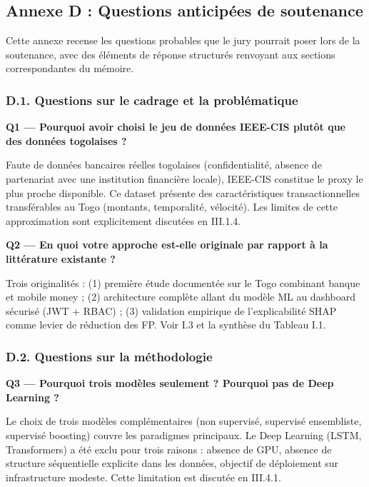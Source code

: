 \documentclass[
  12pt,
]{article}
\begin{document}
\subsection{Annexe D : Questions anticipées de
soutenance}\label{annexe-d-questions-anticipuxe9es-de-soutenance}

Cette annexe recense les questions probables que le jury pourrait poser
lors de la soutenance, avec des éléments de réponse structurés renvoyant
aux sections correspondantes du mémoire.

\subsubsection{D.1. Questions sur le cadrage et la
problématique}\label{d.1.-questions-sur-le-cadrage-et-la-probluxe9matique}

\textbf{Q1 — Pourquoi avoir choisi le jeu de données IEEE-CIS plutôt que
des données togolaises ?}

Faute de données bancaires réelles togolaises (confidentialité, absence
de partenariat avec une institution financière locale), IEEE-CIS
constitue le proxy le plus proche disponible. Ce dataset présente des
caractéristiques transactionnelles transférables au Togo (montants,
temporalité, vélocité). Les limites de cette approximation sont
explicitement discutées en III.1.4.

\textbf{Q2 — En quoi votre approche est-elle originale par rapport à la
littérature existante ?}

Trois originalités : (1) première étude documentée sur le Togo combinant
banque et mobile money ; (2) architecture complète allant du modèle ML
au dashboard sécurisé (JWT + RBAC) ; (3) validation empirique de
l’explicabilité SHAP comme levier de réduction des FP. Voir I.3 et la
synthèse du Tableau I.1.

\subsubsection{D.2. Questions sur la
méthodologie}\label{d.2.-questions-sur-la-muxe9thodologie}

\textbf{Q3 — Pourquoi trois modèles seulement ? Pourquoi pas de Deep
Learning ?}

Le choix de trois modèles complémentaires (non supervisé, supervisé
ensembliste, supervisé boosting) couvre les paradigmes principaux. Le
Deep Learning (LSTM, Transformers) a été exclu pour trois raisons :
absence de GPU, absence de structure séquentielle explicite dans les
données, objectif de déploiement sur infrastructure modeste. Cette
limitation est discutée en III.4.1.
\end{document}
